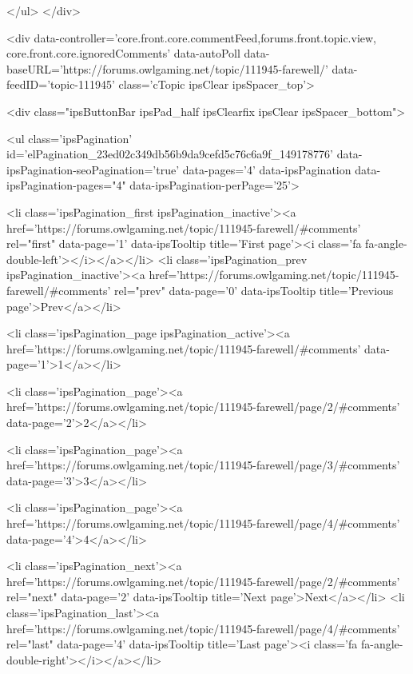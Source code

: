 	</ul>
</div>

<div data-controller='core.front.core.commentFeed,forums.front.topic.view, core.front.core.ignoredComments' data-autoPoll data-baseURL='https://forums.owlgaming.net/topic/111945-farewell/'  data-feedID='topic-111945' class='cTopic ipsClear ipsSpacer_top'>
	
		

				<div class="ipsButtonBar ipsPad_half ipsClearfix ipsClear ipsSpacer_bottom">
					
					
						


	
	<ul class='ipsPagination' id='elPagination_23ed02c349db56b9da9cefd5c76c6a9f_149178776' data-ipsPagination-seoPagination='true' data-pages='4' data-ipsPagination  data-ipsPagination-pages="4" data-ipsPagination-perPage='25'>
		
			
				<li class='ipsPagination_first ipsPagination_inactive'><a href='https://forums.owlgaming.net/topic/111945-farewell/#comments' rel="first" data-page='1' data-ipsTooltip title='First page'><i class='fa fa-angle-double-left'></i></a></li>
				<li class='ipsPagination_prev ipsPagination_inactive'><a href='https://forums.owlgaming.net/topic/111945-farewell/#comments' rel="prev" data-page='0' data-ipsTooltip title='Previous page'>Prev</a></li>
			
			<li class='ipsPagination_page ipsPagination_active'><a href='https://forums.owlgaming.net/topic/111945-farewell/#comments' data-page='1'>1</a></li>
			
				
					<li class='ipsPagination_page'><a href='https://forums.owlgaming.net/topic/111945-farewell/page/2/#comments' data-page='2'>2</a></li>
				
					<li class='ipsPagination_page'><a href='https://forums.owlgaming.net/topic/111945-farewell/page/3/#comments' data-page='3'>3</a></li>
				
					<li class='ipsPagination_page'><a href='https://forums.owlgaming.net/topic/111945-farewell/page/4/#comments' data-page='4'>4</a></li>
				
				<li class='ipsPagination_next'><a href='https://forums.owlgaming.net/topic/111945-farewell/page/2/#comments' rel="next" data-page='2' data-ipsTooltip title='Next page'>Next</a></li>
				<li class='ipsPagination_last'><a href='https://forums.owlgaming.net/topic/111945-farewell/page/4/#comments' rel="last" data-page='4' data-ipsTooltip title='Last page'><i class='fa fa-angle-double-right'></i></a></li>
			
